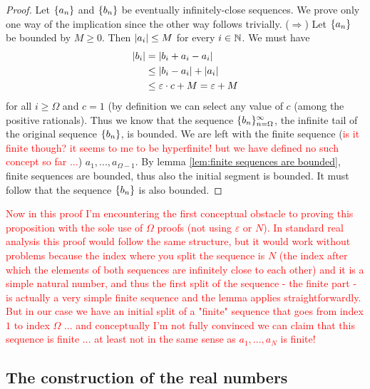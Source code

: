 {
\begin{proof}
    Let $\{a_n\}$ and $\{b_n\}$ be eventually infinitely-close sequences. We prove only one way of the implication since the other way follows trivially. ($\Rightarrow$) Let $\{a_n\}$ be bounded by $M\geq 0$. Then $\left\lvert a_i \right\rvert \leq M$ for every $i \in \mathbb{N}$. We must have
    \begin{align*}
        \left\lvert b_i \right\rvert & = \left\lvert b_i +a_i - a_i \right\rvert \\
        & \leq \left\lvert b_i-a_i \right\rvert +\left\lvert a_i \right\rvert \\
        & \leq \varepsilon \cdot c + M = \varepsilon + M
    \end{align*}
    for all $i \geq \Omega$ and $c=1$ (by definition we can select any value of $c$ (among the positive rationals). Thus we know that the sequence $\{b_n\}_{n=\Omega}^\infty$, the infinite tail of the original sequence $\{b_n\}$, is bounded. We are left with the finite sequence (\textcolor{red}{is it finite though? it seems to me to be hyperfinite! but we have defined no such concept so far ...}) $a_1, ..., a_{\Omega-1}$. By lemma \ref{lem:finite sequences are bounded}, finite sequences are bounded, thus also the initial segment is bounded. It must follow that the sequence $\{b_n\}$ is also bounded.
\end{proof}
\textcolor{red}{Now in this proof I'm encountering the first conceptual obstacle to proving this proposition with the sole use of $\Omega$ proofs (not using $\varepsilon$ or $N$). In standard real analysis this proof would follow the same structure, but it would work without problems because the index where you split the sequence is $N$ (the index after which the elements of both sequences are infinitely close to each other) and it is a simple natural number, and thus the first split of the sequence - the finite part - is actually a very simple finite sequence and the lemma applies straightforwardly. But in our case we have an initial split of a "finite" sequence that goes from index $1$ to index $\Omega$ ... and conceptually I'm not fully convinced we can claim that this sequence is finite ... at least not in the same sense as $a_1, ..., a_N$ is finite!}

\subsection{The construction of the real numbers}

}
